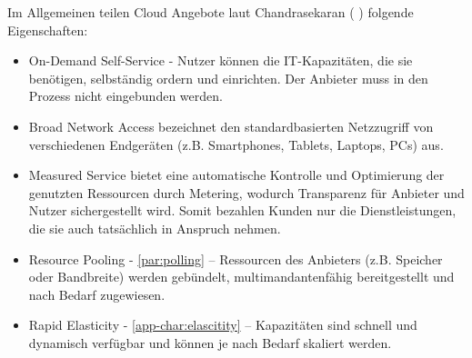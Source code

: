 \documentclass[
12pt,
english,
ngerman,
headsepline,
twoside,
openright,
numbers=noenddot,version=first
]{scrreprt}
\begin{document}
Im Allgemeinen teilen Cloud Angebote laut Chandrasekaran ( \cite{cloudEssentials} ) folgende Eigenschaften:
\begin{itemize}
	\item On-Demand Self-Service - Nutzer können die IT-Kapazitäten, die sie benötigen, selbständig ordern und einrichten. Der Anbieter muss in den Prozess nicht eingebunden werden.
	\item Broad Network Access bezeichnet den standardbasierten Netzzugriff von verschiedenen Endgeräten (z.B. Smartphones, Tablets, Laptops, PCs) aus.
	\item Measured Service bietet eine automatische Kontrolle und Optimierung der genutzten Ressourcen durch Metering, wodurch Transparenz für Anbieter und Nutzer sichergestellt wird. Somit bezahlen Kunden nur die Dienstleistungen, die sie auch tatsächlich in Anspruch nehmen.
	\item Resource Pooling - \autoref{par:polling} – Ressourcen des Anbieters (z.B. Speicher oder Bandbreite) werden gebündelt, multimandantenfähig bereitgestellt und nach Bedarf zugewiesen.
	\item Rapid Elasticity - \autoref{app-char:elascitity} – Kapazitäten sind schnell und dynamisch verfügbar und können je nach Bedarf skaliert werden.\cite{cloudEssentials}
\end{itemize}
\end{document}
